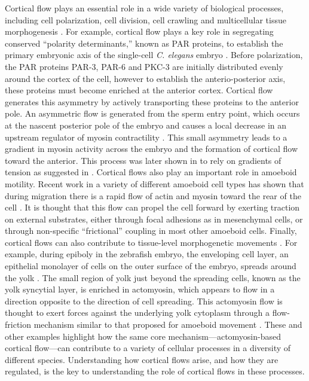Cortical flow plays an essential role in a wide variety of biological processes, including  cell polarization, cell division, cell crawling and multicellular tissue morphogenesis \cite{cellmech_flows3, cellmech_flows2, Benink:2000aa, Wilson:2010aa, Rauzi2010, Munro2004413}. For example, cortical flow plays a key role in segregating conserved  “polarity determinants,” known as PAR proteins, to establish the primary embryonic axis of the single-cell \textit{C. elegans} embryo \cite{Munro2004413,Goehring1208619}. Before polarization, the PAR proteins PAR-3, PAR-6 and PKC-3 are initially distributed evenly around the cortex of the cell, however to establish the anterio-posterior axis, these proteins must become enriched at the anterior cortex. Cortical flow generates this asymmetry by actively transporting these proteins to the anterior pole. An asymmetric flow is generated from the sperm entry point, which occurs at the nascent posterior pole of the embryo and causes a local decrease in an upstream regulator of myosin contractility \cite{Munro2004413}. This small asymmetry leads to a gradient in myosin activity across the embryo and the formation of cortical flow toward the anterior. This process was later shown in \cite{cellmech_flows} to rely on gradients of tension as suggested in \cite{cellmech_flows3}. Cortical flows also play an important role in amoeboid motility. Recent work in a variety of different amoeboid cell types has shown that during migration there is a rapid flow of actin and myosin toward the rear of the cell \cite{amoeba1, amoeba2, amoeba3, amoeba4, Yumura200}. It is thought that this flow can propel the cell forward by exerting traction on external substrates, either through focal adhesions as in mesenchymal cells, or through non-specific “frictional” coupling in most other amoeboid cells\cite{amoeba1}. Finally, cortical flows can also contribute to tissue-level morphogenetic movements \cite{Salbreux2012536,Munjal1789}.  For example, during epiboly in the zebrafish embryo, the enveloping cell layer, an epithelial monolayer of cells on the outer surface of the embryo, spreads around the yolk \cite{epib_review}.  The small region of yolk just beyond the spreading cells, known as the yolk syncytial layer, is enriched in actomyosin, which appears to flow in a direction opposite to the direction of cell spreading. This actomyosin flow is thought to exert forces against the underlying yolk cytoplasm through a flow-friction mechanism similar to that proposed for amoeboid movement \cite{Behrndt257}. These and other examples highlight how the same core mechanism---actomyosin-based cortical flow---can contribute to a variety of cellular processes in a diversity of different species. Understanding how cortical flows arise, and how they are regulated, is the key to understanding the role of cortical flows in these processes.

